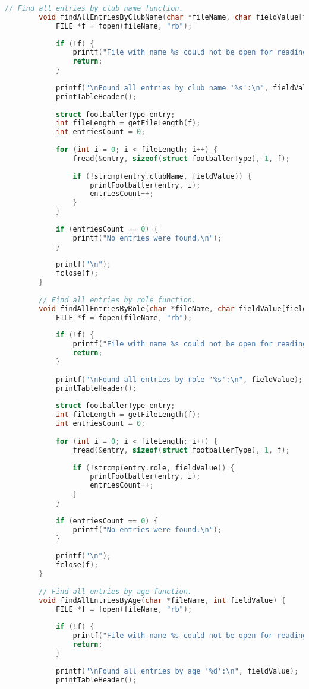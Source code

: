 \documentclass[12pt]{article}
\begin{document}
\begin{lstlisting}[language=C]
		// Find all entries by club name function.
		void findAllEntriesByClubName(char *fileName, char fieldValue[fieldLength]) {
			FILE *f = fopen(fileName, "rb");
			
			if (!f) {
				printf("File with name %s could not be open for reading.\n", fileName);
				return;
			}
			
			printf("\nFound all entries by club name '%s':\n", fieldValue);
			printTableHeader();
			
			struct footballerType entry;
			int fileLength = getFileLength(f);
			int entriesCount = 0;
			
			for (int i = 0; i < fileLength; i++) {
				fread(&entry, sizeof(struct footballerType), 1, f);
				
				if (!strcmp(entry.clubName, fieldValue)) {
					printFootballer(entry, i);
					entriesCount++;
				}
			}
			
			if (entriesCount == 0) {
				printf("No entries were found.\n");
			}
			
			printf("\n");
			fclose(f);
		}
		
		// Find all entries by role function.
		void findAllEntriesByRole(char *fileName, char fieldValue[fieldLength]) {
			FILE *f = fopen(fileName, "rb");
			
			if (!f) {
				printf("File with name %s could not be open for reading.\n", fileName);
				return;
			}
			
			printf("\nFound all entries by role '%s':\n", fieldValue);
			printTableHeader();
			
			struct footballerType entry;
			int fileLength = getFileLength(f);
			int entriesCount = 0;
			
			for (int i = 0; i < fileLength; i++) {
				fread(&entry, sizeof(struct footballerType), 1, f);
				
				if (!strcmp(entry.role, fieldValue)) {
					printFootballer(entry, i);
					entriesCount++;
				}
			}
			
			if (entriesCount == 0) {
				printf("No entries were found.\n");
			}
			
			printf("\n");
			fclose(f);
		}
		
		// Find all entries by age function.
		void findAllEntriesByAge(char *fileName, int fieldValue) {
			FILE *f = fopen(fileName, "rb");
			
			if (!f) {
				printf("File with name %s could not be open for reading.\n", fileName);
				return;
			}
			
			printf("\nFound all entries by age '%d':\n", fieldValue);
			printTableHeader();
			

\end{lstlisting}
\end{document}
